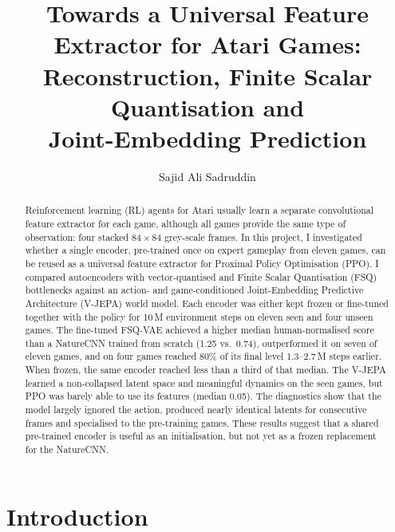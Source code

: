\documentclass[runningheads]{llncs}
\begin{document}
\title{Towards a Universal Feature Extractor for Atari Games:\\
Reconstruction, Finite Scalar Quantisation and\\ Joint-Embedding Prediction}

\author{Sajid Ali Sadruddin}

\maketitle

\begin{abstract}
Reinforcement learning (RL) agents for Atari usually learn a separate convolutional feature
extractor for each game, although all games provide the same type of observation: four
stacked $84\times84$ grey-scale frames. In this project, I investigated whether a single
encoder, pre-trained once on expert gameplay from eleven games, can be reused as a universal
feature extractor for Proximal Policy Optimisation (PPO). I compared autoencoders with
vector-quantised and Finite Scalar Quantisation (FSQ) bottlenecks against an action- and
game-conditioned Joint-Embedding Predictive Architecture (V-JEPA) world model. Each encoder was
either kept frozen or fine-tuned together with the policy for 10\,M environment steps on
eleven seen and four unseen games. The fine-tuned FSQ-VAE achieved a higher median
human-normalised score than a NatureCNN trained from scratch (1.25 vs.\ 0.74), outperformed it
on seven of eleven games, and on four games reached 80\% of its final level 1.3--2.7\,M steps
earlier. When frozen, the same encoder reached less than a third of that median. The V-JEPA
learned a non-collapsed latent space and meaningful dynamics on the seen games, but PPO was
barely able to use its features (median 0.05). The diagnostics show that the model largely
ignored the action, produced nearly identical latents for consecutive frames and specialised
to the pre-training games. These results suggest that a shared pre-trained encoder is useful
as an initialisation, but not yet as a frozen replacement for the NatureCNN.
\end{abstract}

\section{Introduction}
\label{sec:intro}
\end{document}
